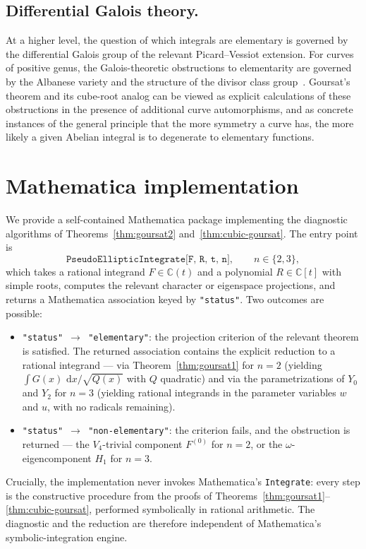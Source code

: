 \documentclass[11pt,a4paper]{article}
\theoremstyle{plain}
\theoremstyle{definition}
\theoremstyle{remark}
\newcommand{\C}{\mathbb{C}}
\renewcommand{\d}{\,\mathrm{d}}
\begin{document}
\subsection*{Differential Galois theory.}
At a higher level, the question of which integrals are elementary is governed by the differential Galois group of the relevant Picard--Vessiot extension. For curves of positive genus, the Galois-theoretic obstructions to elementarity are governed by the Albanese variety and the structure of the divisor class group~\cite{Bertrand1990}. Goursat's theorem and its cube-root analog can be viewed as explicit calculations of these obstructions in the presence of additional curve automorphisms, and as concrete instances of the general principle that the more symmetry a curve has, the more likely a given Abelian integral is to degenerate to elementary functions.



\appendix
\section{Mathematica implementation}\label{sec:appendix}

We provide a self-contained {\sc Mathematica} package implementing the diagnostic algorithms of Theorems~\ref{thm:goursat2} and~\ref{thm:cubic-goursat}. The entry point is
\[
  \texttt{PseudoEllipticIntegrate[F, R, t, n]},\qquad n\in\{2,3\},
\]
which takes a rational integrand $F\in\C(t)$ and a polynomial $R\in\C[t]$ with simple roots, computes the relevant character or eigenspace projections, and returns a Mathematica association keyed by \texttt{"status"}. Two outcomes are possible:
\begin{itemize}
  \item \texttt{"status"\,$\to$\,"elementary"}: the projection criterion of the relevant theorem is satisfied. The returned association contains the explicit reduction to a rational integrand --- via Theorem~\ref{thm:goursat1} for $n=2$ (yielding $\int G(x)\,\d x/\sqrt{Q(x)}$ with $Q$ quadratic) and via the parametrizations of $Y_0$ and $Y_2$ for $n=3$ (yielding rational integrands in the parameter variables $w$ and $u$, with no radicals remaining).
  \item \texttt{"status"\,$\to$\,"non-elementary"}: the criterion fails, and the obstruction is returned --- the $V_4$-trivial component $F^{(0)}$ for $n=2$, or the $\omega$-eigencomponent $H_1$ for $n=3$.
\end{itemize}

Crucially, the implementation never invokes Mathematica's \texttt{Integrate}: every step is the constructive procedure from the proofs of Theorems~\ref{thm:goursat1}--\ref{thm:cubic-goursat}, performed symbolically in rational arithmetic. The diagnostic and the reduction are therefore independent of Mathematica's symbolic-integration engine.
\end{document}
